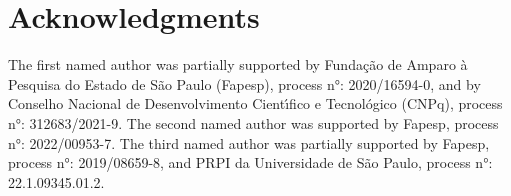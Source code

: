 \documentclass{amsart}
\newcommand{\F}{\mathbb{F}}
\newcommand{\0}{{\vartheta}}
\theoremstyle{definition}
\theoremstyle{remark}
\numberwithin{equation}{section}
\newtheorem*{Theorem A}{\textbf{Theorem A}}
\newtheorem*{Corollary E}{\textbf{Corollary E}}
\newtheorem*{Corollary F}{\textbf{Corollary F}}
\newtheorem*{Theorem B}{\textbf{Theorem B}}
\newtheorem*{Theorem C}{\textbf{Theorem C}}
\newtheorem*{Theorem D}{\textbf{Theorem B}}
\newtheorem*{p a}{\textbf{Proof of  Theorem A}}
\newtheorem*{p b}{\textbf{Proof of Theorem B}}
\newtheorem*{p c}{\textbf{Proof of  Theorem C}}
\newtheorem*{p d}{\textbf{Proof of  Theorem D}}
\begin{document}




\section*{Acknowledgments} 
 
 
The first named author was partially supported by 
Funda\c c\~ao de Amparo \`a Pesquisa do Estado de S\~ao Paulo (Fapesp), process n°:  2020/16594-0, and by  Conselho Nacional de Desenvolvimento Cient\'{\i}fico e Tecnol{\'o}gico (CNPq), process n°: 312683/2021-9. The second named author was supported by Fapesp, process n°: 2022/00953-7. The third named author was partially supported by Fapesp, process n°: 2019/08659-8, and PRPI da Universidade de São Paulo, process n°: 22.1.09345.01.2. 
\end{document}
